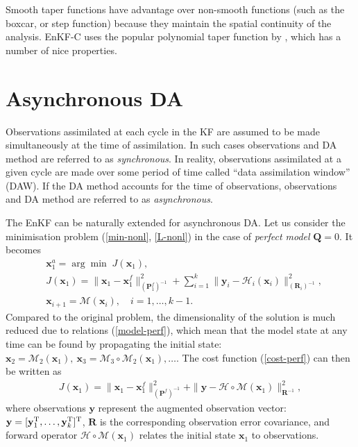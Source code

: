 \documentclass[11pt]{report}
\newcommand{\mb} {\mathbf}
\newcommand{\T}{^{\tiny \mathrm T}}
\begin{document}
Smooth taper functions have advantage over non-smooth functions (such as the boxcar, or step function) because they maintain the spatial continuity of the analysis.
EnKF-C uses the popular polynomial taper function by \citet{gas99a}, which has a number of nice properties.

\section{Asynchronous DA}

Observations assimilated at each cycle in the KF are assumed to be made simultaneously at the time of assimilation.
In such cases observations and DA method are referred to as \emph{synchronous}.
In reality, observations assimilated at a given cycle are made over some period of time called ``data assimilation window'' (DAW).
If the DA method accounts for the time of observations, observations and DA method are referred to as \emph{asynchronous}.

The EnKF can be naturally extended for asynchronous DA.
Let us consider the minimisation problem (\ref{min-nonl}, \ref{L-nonl}) in the case of \emph{perfect model} $\mb Q = 0$.
It becomes
\begin{align}
  \label{min-perf}
  &{\mb x_1^a} = \arg \min \; J(\mb x_1),\\
  \label{cost-perf}
  &J(\mb x_1)  = \|\mb x_1 - \mb x_1^f\|^2_{(\mb P_1^f)^{-1}} + \sum_{i = 1}^k \|\mb y_i - \mathcal H_i(\mb x_i)\|^2_{(\mb R_i)^{-1}},\\
  \label{model-perf}
  &\mb x_{i+1} = \mathcal M(\mb x_i),\quad i = 1,\dots,k-1.
\end{align}
Compared to the original problem, the dimensionality of the solution is much reduced due to relations (\ref{model-perf}), which mean that the model state at any time can be found by propagating the initial state: $\mb x_2 = \mathcal M_2(\mb x_1),\ \mb x_3 = \mathcal M_3 \circ \mathcal M_2(\mb x_1), \dots$.
The cost function (\ref{cost-perf}) can then be written as
\begin{align}
  \label{cost-async}
  J(\mb x_1)  = \|\mb x_1 - \mb x_1^f\|^2_{(\mb P^f)^{-1}} + \|\mb y - \mathcal H \circ \mathcal M(\mb x_1)\|^2_{\mb R^{-1}},
\end{align}
where observations $\mb y$ represent the augmented observation vector: $\mb y = [\mb y_1\T,\dots,\mb y_k\T]\T$, $\mb R$ is the corresponding observation error covariance, and forward operator $\mathcal H \circ \mathcal M (\mb x_1)$ relates the initial state $\mb x_1$ to observations.
\end{document}
